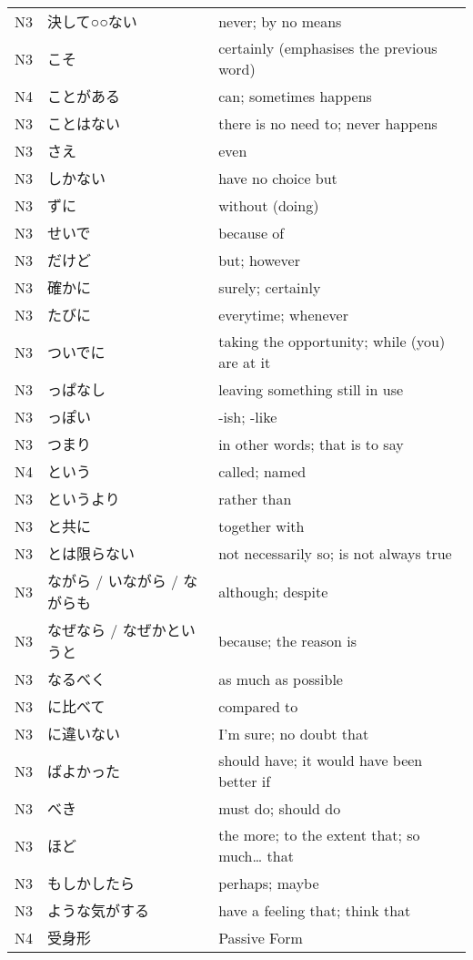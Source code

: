 \begin{table}[h!]
\begin{tabular}{lll}
N3	&   決して○○ない &	never; by no means \\
N3	&   こそ	    &   certainly (emphasises the previous word)\\
N4	&   ことがある   &	can; sometimes happens\\
N3	&   ことはない   &	there is no need to; never happens\\
N3	&   さえ	    &   even  \\
N3	&   しかない    &	have no choice but\\
N3	&   ずに  &   	without (doing) \\
N3	&   せいで &   	because of  \\
N3	&   だけど &   	but; however\\
N3	&   確かに &	    surely; certainly\\
N3	&   たびに &   	everytime; whenever\\
N3	&   ついでに   &	taking the opportunity; while (you) are at it\\
N3	&   っぱなし  &	    leaving something still in use\\
N3	&   っぽい &   	    -ish; -like \\
N3	&   つまり &   	    in other words; that is to say\\
N4	&   という &   	    called; named\\
N3	&   というより  &    rather than\\
N3	&   と共に &   	    together with\\
N3	&   とは限らない &	not necessarily so; is not always true\\
N3	&   ながら / いながら / ながらも	&   although; despite \\
N3	&   なぜなら / なぜかというと  &	because; the reason is\\
N3	&   なるべく    &	as much as possible\\
N3	&   に比べて	&       compared to\\
N3	&   に違いない   &	I'm sure; no doubt that\\
N3	&   ばよかった   &	should have; it would have been better if\\
N3	&   べき       &   	must do; should do\\
N3	&   ほど	    &       the more; to the extent that; so much… that\\
N3	&   もしかしたら  &	perhaps; maybe\\
N3	&   ような気がする &	have a feeling that; think that\\
N4	&   受身形 &        Passive Form\\

\end{tabular}
\end{table}
